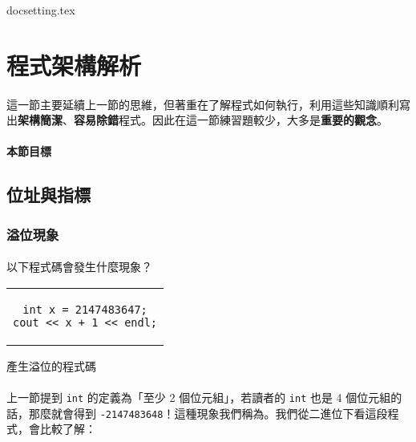 \documentclass[12pt,a4paper,oneside]{article}
\begin{document}
\begin{CJK}{UTF8}{bkai}

{docsetting.tex}
\setcounter{section}{1}

\fi


\section{程式架構解析}

\paragraph{}這一節主要延續上一節的思維，但著重在了解程式如何執行，利用這些知識順利寫出\textbf{架構簡潔}、\textbf{容易除錯}程式。因此在這一節練習題較少，大多是\textbf{重要的觀念}。

\paragraph{本節目標}

\subsection{位址與指標}

\subsubsection{溢位現象}

\paragraph{}以下程式碼會發生什麼現象？
\begin{code}[h!]
\centering
\begin{tabular}{c}
\begin{lstlisting}
int x = 2147483647;
cout << x + 1 << endl;
\end{lstlisting}
\end{tabular}
\caption{產生溢位的程式碼}
\label{program:struct:code:overflow}
\end{code}

\paragraph{}上一節提到 \lstinline!int! 的定義為「至少 2 個位元組」，若讀者的 \lstinline!int! 也是 4 個位元組的話，那麼就會得到 \lstinline!-2147483648!！這種現象我們稱為。我們從二進位下看這段程式，會比較了解：


\end{CJK}
\end{document}
